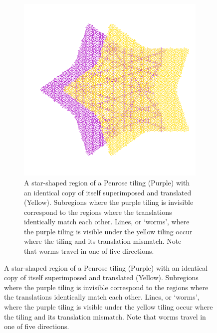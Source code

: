 \documentclass[
  oneside,
  11pt, a4paper,
  footinclude=true,
  headinclude=true,
  cleardoublepage=empty
]{scrbook}
\begin{document}
\begin{figure}[h]
\centering
\begin{subfigure}{0.8\textwidth}
\includegraphics[width=\textwidth]{TranslateFar}
\caption{A star-shaped region of a Penrose tiling (Purple) with an identical copy of itself superimposed and translated (Yellow). Subregions where the purple tiling is invisible correspond to the regions where the translations identically match each other. Lines, or `worms', where the purple tiling is visible under the yellow tiling occur where the tiling and its translation mismatch. Note that worms travel in one of five directions.}
\label{fig:far}
\end{subfigure}


\end{figure}
\end{document}
